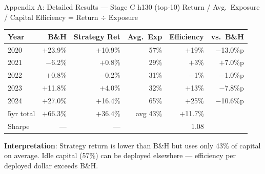 \documentclass[aspectratio=169]{beamer}
\begin{document}
\appendix

\begin{frame}{Appendix A: Detailed Results — Stage C h130 (top-10)}
  \small
  Return / Avg.\ Exposure / Capital Efficiency = Return $\div$ Exposure

  \vspace{0.4em}
  \begin{tabular}{lrrrrr}
    \toprule
    Year & B\&H & Strategy Ret & Avg.\ Exp & Efficiency & vs.\ B\&H \\
    \midrule
    2020 & $+$23.9\% & $+$10.9\% & 57\% & $+$19\% & $-$13.0\%p \\
    2021 & $-$6.2\%  & $+$0.8\%  & 29\% & $+$3\%  & $+$7.0\%p  \\
    2022 & $+$0.8\%  & $-$0.2\%  & 31\% & $-$1\%  & $-$1.0\%p  \\
    2023 & $+$11.8\% & $+$4.0\%  & 32\% & $+$13\% & $-$7.8\%p  \\
    2024 & $+$27.0\% & $+$16.4\% & 65\% & $+$25\% & $-$10.6\%p \\
    \midrule
    5yr total & $+$66.3\%  & $+$36.4\%  & avg 43\% & $+$11.7\%  & \\
    Sharpe    & ---        & ---        &          & 1.08       & \\
    \bottomrule
  \end{tabular}

  \vspace{0.4em}
  \textbf{Interpretation}: Strategy return is lower than B\&H but uses only 43\% of capital on average.
  Idle capital (57\%) can be deployed elsewhere --- efficiency per deployed dollar exceeds B\&H.
\end{frame}
\end{document}
